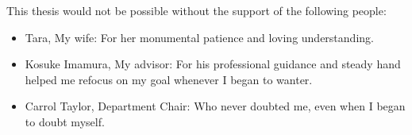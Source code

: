This thesis would not be possible without the support of the following people:

\begin{itemize}
    \item Tara, My wife:  For her monumental patience and loving understanding.
    \item Kosuke Imamura, My advisor:  For his professional guidance and steady hand helped me refocus on my goal whenever I began to wanter.
    \item Carrol Taylor, Department Chair:  Who never doubted me, even when I began to doubt myself.
\end{itemize}
